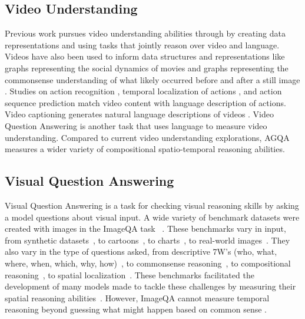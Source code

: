 \subsection{Video Understanding}

Previous work pursues video understanding abilities through by creating data representations and using tasks that jointly reason over video and language. 
Videos have also been used to inform data structures and representations like graphs representing the social dynamics of movies and graphs \cite{vicol2018moviegraphs} representing the commonsense understanding of what likely occurred before and after a still image \cite{park2020visualcomet}. Studies on action recognition \cite{fernando2016discriminative, song2016multimodal}, temporal localization of actions \cite{anne2017localizing,gao2017tall}, and action sequence prediction \cite{nagarajan2020ego} match video content with language description of actions. Video captioning generates natural language descriptions of videos \cite{gan2017semantic, guadarrama2013youtube2text, venugopalan2015sequence}. Video Question Answering is another task that uses language to measure video understanding. Compared to current video understanding explorations, AGQA measures a wider variety of compositional spatio-temporal reasoning abilities. 

\subsection{Visual Question Answering}
Visual Question Answering is a task for checking visual reasoning skills by asking a model questions about visual input. A wide variety of benchmark datasets were created with images in the ImageQA task ~\cite{johnson2017clevr,hudson2019gqa,antol2015vqa,zellers2019recognition,goyal2017making,krishna2017visual,zhu2016visual7w,kim2020answering}. These benchmarks vary in input, from synthetic datasets~\cite{johnson2017clevr}, to cartoons~\cite{antol2015vqa}, to charts~\cite{kim2017deepstory}, to real-world images~\cite{hudson2019gqa,krishna2017visual,zhu2016visual7w,goyal2017making,zellers2019recognition,antol2015vqa}. They also vary in the type of questions asked, from descriptive 7W's (who, what, where, when, which, why, how)~\cite{zhu2016visual7w}, to commonsense reasoning~\cite{zellers2019recognition}, to compositional reasoning~\cite{johnson2017clevr,hudson2019gqa}, to spatial localization~\cite{zhu2016visual7w,krishna2017visual,hudson2019gqa}. These benchmarks facilitated the development of many models made to tackle these challenges by measuring their spatial reasoning abilities~\cite{lu2016hierarchical, vatashsky2020vqa, chen2020counterfactual}. However, ImageQA cannot measure temporal reasoning beyond guessing what might happen based on common sense \cite{zellers2019recognition}.

